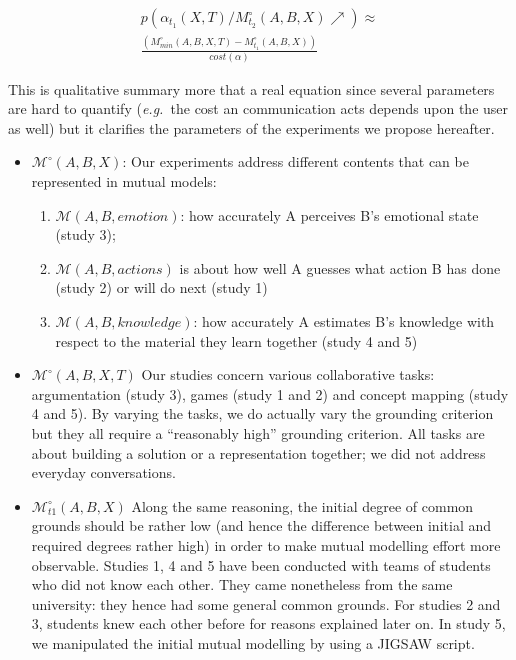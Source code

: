 \documentclass[twocolumn]{article}
\newcommand{\eg}{{\textit{e.g.\ }}}
\newcommand{\model}[3]{{$\mathcal{M}(#1, #2, #3)$}}
\newcommand{\Model}[3]{{$\mathcal{M}^{\circ}(#1, #2, #3)$}}
\begin{document}
\begin{multline} \label{eq:probrepair}
p(\alpha_{t_1}(X,T) / M^{\circ}_{t_2}(A,B,X) \nearrow) \approx \\
\frac{(M^{\circ}_{min}(A,B,X,T) - M^{\circ}_{t_1}(A,B,X))}{cost (\alpha)}
\end{multline}

This is qualitative summary more that a real equation since several parameters
are hard to quantify (\eg the cost an communication acts depends upon the user
as well) but it clarifies the parameters of the experiments we propose hereafter.

\begin{itemize}
    \item \Model{A}{B}{X}: Our experiments address different contents that can be
        represented in mutual models:

    \begin{enumerate}
        \item \model{A}{B}{emotion}: how accurately A perceives B's emotional state
            (study 3); 

        \item \model{A}{B}{actions} is about how well A guesses what action B has
            done (study 2) or will do next  (study 1)

        \item \model{A}{B}{knowledge}: how accurately A estimates B's knowledge
            with respect to the material they learn together (study 4 and 5)

    \end{enumerate}



    \item \Model{A,B}{X}{T} Our studies concern various collaborative tasks:
        argumentation (study 3), games (study 1 and 2) and concept mapping
        (study 4 and 5). By varying the tasks, we do actually vary the grounding
        criterion but they all require a ``reasonably high'' grounding criterion.
        All tasks are about building a solution or a representation together; we
        did not address everyday conversations. 

    \item $\mathcal{M}^{\circ}_{t1}(A,B,X)$ Along the same reasoning, the initial degree
        of common grounds should be rather low (and hence the difference between
        initial and required degrees rather high) in order to make mutual
        modelling effort more observable. Studies 1, 4 and 5 have been conducted
        with teams of students who did not know each other. They came
        nonetheless from the same university: they hence had some general common
        grounds.  For studies 2 and 3, students knew each other before for
        reasons explained later on. In study 5, we manipulated the initial mutual modelling by
        using a JIGSAW script.


\end{itemize}
\end{document}
